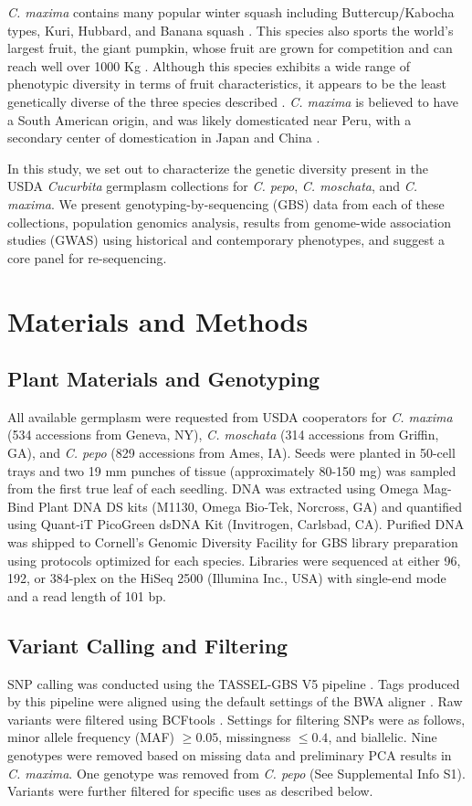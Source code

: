 \documentclass[utf8]{FrontiersinHarvard} %
\begin{document}
\emph{C. maxima} contains many popular winter squash including Buttercup/Kabocha types, Kuri, Hubbard, and Banana squash \citep{Ferriol}.
This species also sports the world's largest fruit, the giant pumpkin, whose fruit are grown for competition and can reach well over 1000 Kg \citep{Savage015}.
Although this species exhibits a wide range of phenotypic diversity in terms of fruit characteristics, it appears to be the least genetically diverse of the three species described \citep{Kates2017}.
\emph{C. maxima} is believed to have a South American origin, and was likely domesticated near Peru, with a secondary center of domestication in Japan and China \citep{Nee1990,Sun2017}.

In this study, we set out to characterize the genetic diversity present in the USDA \emph{Cucurbita} germplasm collections for \emph{C. pepo}, \emph{C. moschata}, and \emph{C. maxima}.
We present genotyping-by-sequencing (GBS) data from each of these collections, population genomics analysis, results from genome-wide association studies (GWAS) using historical and contemporary phenotypes, and suggest a core panel for re-sequencing.


\section{Materials and Methods}

\subsection{Plant Materials and Genotyping}
All available germplasm were requested from USDA cooperators for \textit{C. maxima} (534 accessions from Geneva, NY), \textit{C. moschata} (314 accessions from Griffin, GA), and \textit{C. pepo} (829 accessions from Ames, IA). Seeds were planted in 50-cell trays and two 19 mm punches of tissue (approximately 80-150 mg) was sampled from the first true leaf of each seedling. DNA was extracted using Omega Mag-Bind Plant DNA DS kits (M1130, Omega Bio-Tek, Norcross, GA) and quantified using Quant-iT PicoGreen dsDNA Kit (Invitrogen, Carlsbad, CA). Purified DNA was shipped to Cornell’s Genomic Diversity Facility for GBS library preparation using protocols optimized for each species. Libraries were sequenced at either 96, 192, or 384-plex on the HiSeq 2500 (Illumina Inc., USA) with single-end mode and a read length of 101 bp.

\subsection{Variant Calling and Filtering}
SNP calling was conducted using the TASSEL-GBS V5 pipeline \citep{Glaubitz2014}. Tags produced by this pipeline were aligned using the default settings of the BWA aligner \citep{Li2009}. Raw variants were filtered using BCFtools \citep{Danecek2021}. Settings for filtering SNPs were as follows, minor allele frequency (MAF) $\geq 0.05$, missingness $\leq 0.4$, and biallelic. Nine genotypes were removed based on missing data and preliminary PCA  results in \textit{C. maxima}. One genotype was removed from \textit{C. pepo} (See Supplemental Info S1). Variants were further filtered for specific uses as described below.
\end{document}
